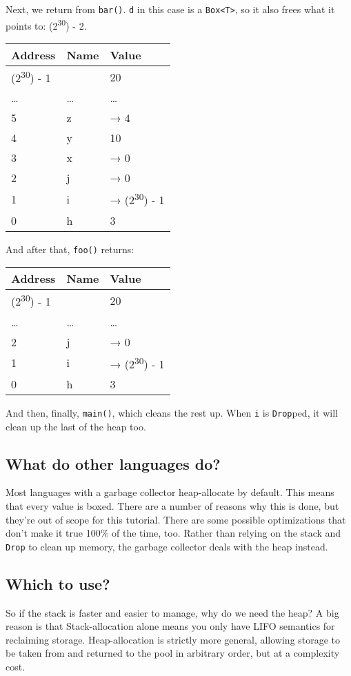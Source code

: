 \documentclass[a4paper,]{book}
\begin{document}
Next, we return from \texttt{bar()}. \texttt{d} in this case is a
\texttt{Box\textless{}T\textgreater{}}, so it also frees what it points
to: (2\textsuperscript{30}) - 2.

\begin{longtable}[c]{@{}lll@{}}
\toprule
Address & Name & Value\tabularnewline
\midrule
\endhead
(2\textsuperscript{30}) - 1 & & 20\tabularnewline
\ldots{} & \ldots{} & \ldots{}\tabularnewline
5 & z & → 4\tabularnewline
4 & y & 10\tabularnewline
3 & x & → 0\tabularnewline
2 & j & → 0\tabularnewline
1 & i & → (2\textsuperscript{30}) - 1\tabularnewline
0 & h & 3\tabularnewline
\bottomrule
\end{longtable}

And after that, \texttt{foo()} returns:

\begin{longtable}[c]{@{}lll@{}}
\toprule
Address & Name & Value\tabularnewline
\midrule
\endhead
(2\textsuperscript{30}) - 1 & & 20\tabularnewline
\ldots{} & \ldots{} & \ldots{}\tabularnewline
2 & j & → 0\tabularnewline
1 & i & → (2\textsuperscript{30}) - 1\tabularnewline
0 & h & 3\tabularnewline
\bottomrule
\end{longtable}

And then, finally, \texttt{main()}, which cleans the rest up. When
\texttt{i} is \texttt{Drop}ped, it will clean up the last of the heap
too.

\subsection{What do other languages
do?}\label{what-do-other-languages-do}

Most languages with a garbage collector heap-allocate by default. This
means that every value is boxed. There are a number of reasons why this
is done, but they're out of scope for this tutorial. There are some
possible optimizations that don't make it true 100\% of the time, too.
Rather than relying on the stack and \texttt{Drop} to clean up memory,
the garbage collector deals with the heap instead.

\subsection{Which to use?}\label{which-to-use}

So if the stack is faster and easier to manage, why do we need the heap?
A big reason is that Stack-allocation alone means you only have LIFO
semantics for reclaiming storage. Heap-allocation is strictly more
general, allowing storage to be taken from and returned to the pool in
arbitrary order, but at a complexity cost.
\end{document}
